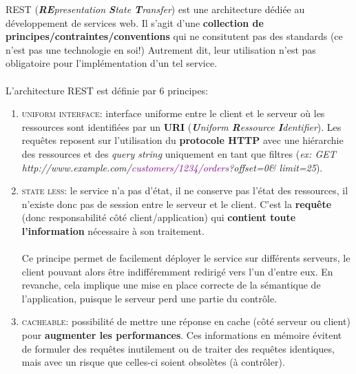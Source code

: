 \item{}
{
REST (\textit{\textbf{RE}presentation \textbf{S}tate \textbf{T}ransfer}) est une architecture dédiée au développement de services web. Il s'agit d'une \textbf{collection de principes/contraintes/conventions} qui ne consitutent pas des standards (ce n'est pas une technologie en soi!) Autrement dit, leur utilisation n'est pas obligatoire pour l'implémentation d'un tel service.
\paragraph{}
L'architecture REST est définie par 6 principes:
\begin{enumerate}\setlength{\itemsep}{.3em}
\item\textcolor{ltred}{\textsc{uniform interface}}: interface uniforme entre le client et le serveur où les ressources sont identifiées par un \textbf{URI} (\textit{\textbf{U}niform \textbf{R}essource \textbf{I}dentifier}). Les requêtes reposent sur l'utilisation du \textbf{protocole HTTP} avec une hiérarchie des ressources et des \textit{query string} uniquement en tant que filtres (\textit{ex: \textcolor{dkyellow}{GET} http://www.example.com/\textcolor{purple}{customers/1234/orders}\textcolor{dkgreen}{?offset=0\& limit=25}}).

\item\textcolor{ltred}{\textsc{state less}}: le service n'a pas d'état, il ne conserve pas l'état des ressources, il n'existe donc pas de session entre le serveur et le client. C'est la \textbf{requête} (donc responsabilité côté client/application) qui \textbf{contient toute l'information} nécessaire à son traitement.\paragraph{}Ce principe permet de facilement déployer le service sur différents serveurs, le client pouvant alors être indifféremment redirigé vers l'un d'entre eux. En revanche, cela implique une mise en place correcte de la sémantique de l'application, puisque le serveur perd une partie du contrôle.

\item\textcolor{ltred}{\textsc{cacheable}}: possibilité de mettre une réponse en cache (côté serveur ou client) pour \textbf{augmenter les performances}. Ces informations en mémoire évitent de formuler des requêtes inutilement ou de traiter des requêtes identiques, mais avec un risque que celles-ci soient obsolètes (à contrôler).


\end{enumerate}}
